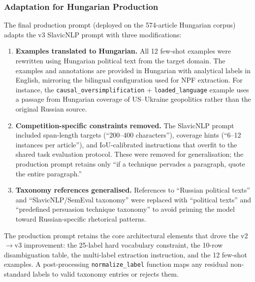 \documentclass[10pt, a4paper]{article}
\begin{document}
\subsubsection{Adaptation for Hungarian Production}
\label{sec:manipulation_hungarian}

The final production prompt (deployed on the 574-article Hungarian corpus) adapts the v3 SlavicNLP prompt with three modifications:

\begin{enumerate}
\item \textbf{Examples translated to Hungarian.} All 12 few-shot examples were rewritten using Hungarian political text from the target domain. The examples and annotations are provided in Hungarian with analytical labels in English, mirroring the bilingual configuration used for NPF extraction. For instance, the \texttt{causal\_oversimplification} + \texttt{loaded\_language} example uses a passage from Hungarian coverage of US--Ukraine geopolitics rather than the original Russian source.
\item \textbf{Competition-specific constraints removed.} The SlavicNLP prompt included span-length targets (``200--400 characters''), coverage hints (``6--12 instances per article''), and IoU-calibrated instructions that overfit to the shared task evaluation protocol. These were removed for generalisation; the production prompt retains only ``if a technique pervades a paragraph, quote the entire paragraph.''
\item \textbf{Taxonomy references generalised.} References to ``Russian political texts'' and ``SlavicNLP/SemEval taxonomy'' were replaced with ``political texts'' and ``predefined persuasion technique taxonomy'' to avoid priming the model toward Russian-specific rhetorical patterns.
\end{enumerate}

The production prompt retains the core architectural elements that drove the v2$\to$v3 improvement: the 25-label hard vocabulary constraint, the 10-row disambiguation table, the multi-label extraction instruction, and the 12 few-shot examples. A post-processing \texttt{normalize\_label} function maps any residual non-standard labels to valid taxonomy entries or rejects them.

\end{document}
